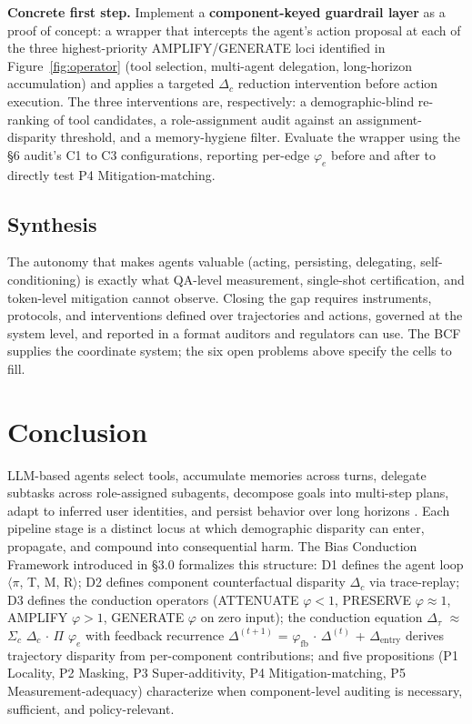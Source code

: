 \documentclass[acmsmall,nonacm]{acmart}
\begin{document}
\textbf{Concrete first step.} Implement a \textbf{component-keyed guardrail layer} as a proof of concept: a wrapper that intercepts the agent's action proposal at each of the three highest-priority AMPLIFY/GENERATE loci identified in Figure~\ref{fig:operator} (tool selection, multi-agent delegation, long-horizon accumulation) and applies a targeted $\Delta_c$ reduction intervention before action execution. The three interventions are, respectively: a demographic-blind re-ranking of tool candidates, a role-assignment audit against an assignment-disparity threshold, and a memory-hygiene filter. Evaluate the wrapper using the \S{}6 audit's C1 to C3 configurations, reporting per-edge $\varphi_e$ before and after to directly test P4 Mitigation-matching.

\subsection{Synthesis}

The autonomy that makes agents valuable (acting, persisting, delegating, self-conditioning) is exactly what QA-level measurement, single-shot certification, and token-level mitigation cannot observe. Closing the gap requires instruments, protocols, and interventions defined over trajectories and actions, governed at the system level, and reported in a format auditors and regulators can use. The BCF supplies the coordinate system; the six open problems above specify the cells to fill.


\section{Conclusion}

LLM-based agents select tools, accumulate memories across turns, delegate subtasks across role-assigned subagents, decompose goals into multi-step plans, adapt to inferred user identities, and persist behavior over long horizons \cite{wang2024survey,xi2023rise}. Each pipeline stage is a distinct locus at which demographic disparity can enter, propagate, and compound into consequential harm. The Bias Conduction Framework introduced in \S{}3.0 formalizes this structure: D1 defines the agent loop $\langle$$\pi$, T, M, R$\rangle$; D2 defines component counterfactual disparity $\Delta_c$ via trace-replay; D3 defines the conduction operators (ATTENUATE $\varphi < 1$, PRESERVE $\varphi \approx 1$, AMPLIFY $\varphi > 1$, GENERATE $\varphi$ on zero input); the conduction equation $\Delta_\tau$ $\approx$ $\Sigma_c$ $\Delta_c$ $\cdot$ $\Pi$ $\varphi_e$ with feedback recurrence $\Delta^{(t+1)}$ = $\varphi_{\mathrm{fb}}$ $\cdot$ $\Delta^{(t)}$ + $\Delta_{\mathrm{entry}}$ derives trajectory disparity from per-component contributions; and five propositions (P1 Locality, P2 Masking, P3 Super-additivity, P4 Mitigation-matching, P5 Measurement-adequacy) characterize when component-level auditing is necessary, sufficient, and policy-relevant.
\end{document}
